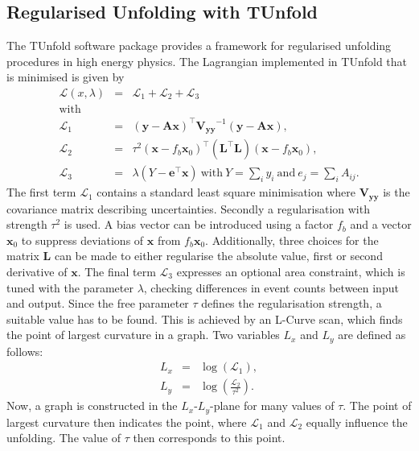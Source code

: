 \subsection{Regularised Unfolding with TUnfold}
	The TUnfold software package \cite{tunfold} provides a framework for regularised unfolding procedures in high energy physics. The Lagrangian implemented in TUnfold that is minimised is given by
	\begin{eqnarray}
	\label{eq:unfold_lagrange}
	\mathcal{L}(x,\lambda) &=& \mathcal{L}_1 + \mathcal{L}_2 + \mathcal{L}_3 
	\\ \nonumber \text{with}
	\\ 
	\label{eq:unfold_lagrange1}
	\mathcal{L}_1 &=& (\mathbf{y} - \mathbf{Ax})^\intercal \mathbf{V_{yy}}^{-1} (\mathbf{y} - \mathbf{Ax}),
	\\
	\label{eq:unfold_lagrange2}
	\mathcal{L}_2 &=& \tau^2 (\mathbf{x} - f_b \mathbf{x}_0)^\intercal (\mathbf{L}^\intercal \mathbf{L}) (\mathbf{x} - f_b \mathbf{x}_0),
	\\
	\label{eq:unfold_lagrange3}
	\mathcal{L}_3 &=& \lambda (Y-\mathbf{e}^\intercal \mathbf{x}) \ \text{with} \ Y=\sum_{i} y_i \ \text{and} \ e_j = \sum_{i}A_{ij}.
	\end{eqnarray}
	The first term $\mathcal{L}_1$ contains a standard least square minimisation where $\mathbf{V_{yy}}$ is the covariance matrix describing uncertainties. Secondly a regularisation with strength $\tau^2$ is used. A bias vector can be introduced using a factor $f_b$ and a vector $\mathbf{x}_0$ to suppress deviations of $\mathbf{x}$ from $f_b\mathbf{x}_0$. Additionally, three choices for the matrix $\mathbf{L}$ can be made to either regularise the absolute value, first or second derivative of $\mathbf{x}$. The final term $\mathcal{L}_3$ expresses an optional area constraint, which is tuned with the parameter $\lambda$, checking differences in event counts between input and output. Since the free parameter $\tau$ defines the regularisation strength, a suitable value has to be found. This is achieved by an L-Curve scan, which finds the point of largest curvature in a graph. Two variables $L_x$ and $L_y$ are defined as follows:
	\begin{eqnarray}
	L_x  &=& \log \left(  \mathcal{L}_1 \right), \\
	L_y  &=& \log \left(  \frac{\mathcal{L}_2}{\tau^2} \right).
	\end{eqnarray}
	Now, a graph is constructed in the $L_x$-$L_y$-plane for many values of $\tau$. The point of largest curvature then indicates the point, where $\mathcal{L}_1$ and $\mathcal{L}_2$ equally influence the unfolding. The value of $\tau$ then corresponds to this point. 
	
